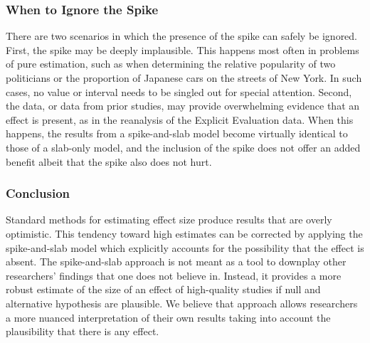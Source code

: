 \documentclass[a4paper]{article}
\newenvironment{revision}{\color{teal}}{\color{black}}
\begin{document}
\subsubsection*{When to Ignore the Spike}
There are two scenarios in which the presence of the spike can safely be ignored.
First, the spike may be deeply implausible.
This happens most often in problems of pure estimation, such as when determining the relative popularity of two politicians or the proportion of Japanese cars on the streets of New York.
In such cases, no value or interval needs to be singled out for special attention.
Second, the data\begin{revision}, or data from prior studies,\end{revision} may provide overwhelming evidence that an effect is present\begin{revision}, as in the reanalysis of the Explicit Evaluation data.\end{revision}
When this happens, the results from a spike-and-slab model become virtually identical to those of a slab-only model, and the inclusion of the spike does not offer an added benefit albeit that the spike also does not hurt. %



\subsubsection*{Conclusion}
Standard methods for estimating effect size produce results that are overly optimistic.
This \begin{revision}tendency\end{revision} toward high estimates can be corrected by applying the spike-and-slab model which explicitly accounts for the possibility that the effect is absent. 
\begin{revision}%
The spike-and-slab approach is not meant as a tool to downplay other researchers' findings that one does not believe in.
Instead, it provides a more robust estimate of the size of an effect of high-quality studies if null and alternative hypothesis are plausible.
We believe that approach allows researchers a more nuanced interpretation of their own results taking into account the plausibility that there is any effect.
\end{revision}
\end{document}
